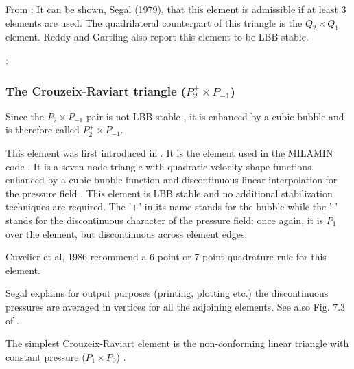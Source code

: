 From \cite{segal}: 
It can be shown, Segal (1979), that this element is admissible if at least 3 elements 
are used. The quadrilateral counterpart of this triangle is the $Q_2\times Q_1$ element.
Reddy and Gartling \cite[p179]{reddybook2} also report this element to be LBB stable.

\Literature: \cite{scan85}


\subsubsection{The Crouzeix-Raviart triangle ($P_2^+\times P_{-1}$)}
\label{sec:crouzeix-raviart}

Since the $P_2\times P_{-1}$ pair is not LBB stable \cite[p179]{reddybook2}, 
it is enhanced by a cubic bubble and is therefore called $P_2^+\times P_{-1}$. 

This element was first introduced in \cite{crra73}.
It is the element used in the MILAMIN code \cite{daks08}.
It is a seven-node triangle with quadratic velocity shape 
functions enhanced by a cubic bubble function and discontinuous linear interpolation for 
the pressure field \cite{cuss86}. 
This element is LBB stable and no additional stabilization techniques are required\cite{elsw}.
The '+' in its name stands for the bubble while the '-' stands for the discontinuous
character of the pressure field: once again, it is $P_1$ over the element, but discontinuous
across element edges.

\begin{remark}
Cuvelier et al, 1986 \cite{cuss86} recommend a 6-point or 7-point quadrature rule for this element.
\end{remark}

\begin{remark}
Segal \cite{segal} explains 
for output purposes (printing, plotting etc.) the discontinuous pressures are averaged 
in vertices for all the adjoining elements. See also Fig. 7.3 of \cite{cuss86}.
\end{remark}

\begin{remark}
The simplest Crouzeix-Raviart element is the non-conforming linear triangle 
with constant pressure ($P_1\times P_0$) \cite{cuss86}. 
\end{remark}

